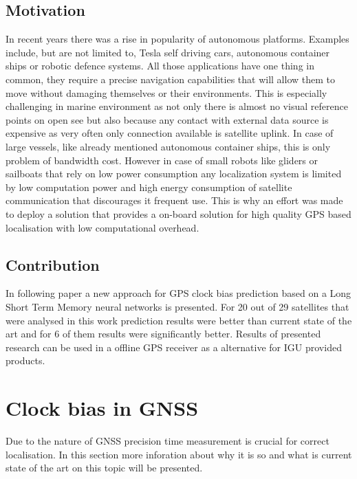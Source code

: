 \documentclass{kybernetika}
\begin{document}
\subsection{Motivation}
In recent years there was a rise in popularity of autonomous platforms. Examples include, but
are not limited to, Tesla self driving cars, autonomous container ships or robotic defence 
systems. All those applications have one thing in common, they require a precise navigation 
capabilities that will allow them to move without damaging themselves or their environments. 
This is especially challenging in marine environment as not only there is almost no visual
reference points on open see but also because any contact with external data source is expensive
as very often only connection available is satellite uplink.
In case of large vessels, like already mentioned autonomous container ships, this is only
problem of bandwidth cost. 
However in case of small robots like gliders or sailboats that rely on low power consumption 
any localization system is limited by low computation power and high energy consumption of 
satellite communication that discourages it frequent use.
This is why an effort was made to deploy a solution that provides a on-board solution for high
quality GPS based localisation with low computational overhead.

\subsection{Contribution}
In following paper a new approach for GPS clock bias prediction based on a Long Short Term Memory
neural networks is presented. For 20 out of 29 satellites that were analysed in this work 
prediction results were better than current state of the art and for 6 of them results were
significantly better. Results of presented research can be used in a offline GPS receiver as 
a alternative for IGU provided products.


\section{Clock bias in GNSS}
Due to the nature of GNSS precision time measurement is crucial for correct localisation.
In this section more inforation about why it is so and what is current state of the art on this
topic will be presented.
\end{document}
